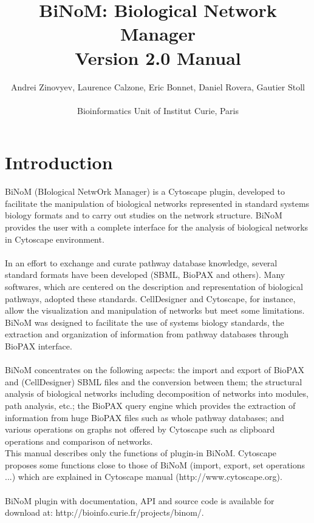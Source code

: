 \documentclass[11pt]{article}
\begin{document}
\title{\huge{BiNoM: Biological Network Manager \\ Version 2.0 Manual}}
\author{ Andrei Zinovyev, Laurence Calzone, Eric Bonnet, Daniel
Rovera, Gautier Stoll \\ \\ Bioinformatics Unit of Institut Curie, Paris}
\maketitle
\tableofcontents
\newpage
\section{Introduction}
BiNoM (BIological NetwOrk Manager) is a Cytoscape plugin, developed to facilitate the manipulation of biological networks represented in standard systems biology formats and to carry out studies on the network structure. BiNoM provides the user with a complete interface for the analysis of biological networks in Cytoscape environment.\\\\
In an effort to exchange and curate pathway database knowledge, several standard formats have been developed (SBML, BioPAX \cite{stromback2005representation} and others). Many softwares, which are centered on the description and representation of biological pathways, adopted these standards. CellDesigner\cite{kitano2005using} and Cytoscape\cite{shannon2003cytoscape}, for instance, allow the visualization and manipulation of networks but meet some limitations. BiNoM was designed to facilitate the use of systems biology standards, the extraction and organization of information from pathway databases through BioPAX interface.\\\\
BiNoM concentrates on the following aspects: the import and export of BioPAX and (CellDesigner) SBML files and the conversion between them; the structural analysis of biological networks including decomposition of networks into modules, path analysis, etc.; the BioPAX query engine which provides the extraction of information from huge BioPAX files such as whole pathway databases; and various operations on graphs not offered by Cytoscape such as clipboard operations and comparison of networks.\\
This manual describes only the functions of plugin-in BiNoM. Cytoscape proposes some functions close to those of BiNoM (import, export, set operations ...) which are explained in Cytoscape manual (http://www.cytoscape.org).
\\\\
BiNoM plugin with documentation, API and source code is available for download at: http://bioinfo.curie.fr/projects/binom/.\\\\
\end{document}
